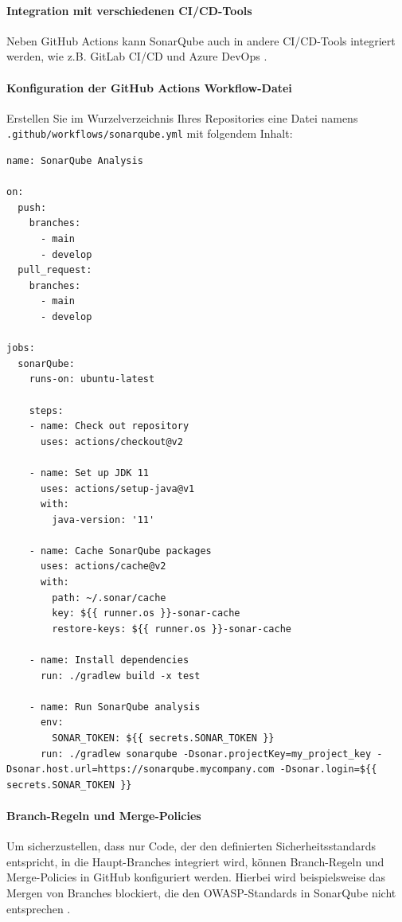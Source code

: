 \paragraph{Integration mit verschiedenen CI/CD-Tools}

Neben GitHub Actions kann SonarQube auch in andere CI/CD-Tools integriert werden, wie z.B. GitLab CI/CD und Azure DevOps \cite{SonarSource2023}.

\paragraph{Konfiguration der GitHub Actions Workflow-Datei}

Erstellen Sie im Wurzelverzeichnis Ihres Repositories eine Datei namens \texttt{.github/workflows/sonarqube.yml} mit folgendem Inhalt:

\begin{lstlisting}
name: SonarQube Analysis

on:
  push:
    branches:
      - main
      - develop
  pull_request:
    branches:
      - main
      - develop

jobs:
  sonarQube:
    runs-on: ubuntu-latest

    steps:
    - name: Check out repository
      uses: actions/checkout@v2

    - name: Set up JDK 11
      uses: actions/setup-java@v1
      with:
        java-version: '11'

    - name: Cache SonarQube packages
      uses: actions/cache@v2
      with:
        path: ~/.sonar/cache
        key: ${{ runner.os }}-sonar-cache
        restore-keys: ${{ runner.os }}-sonar-cache

    - name: Install dependencies
      run: ./gradlew build -x test

    - name: Run SonarQube analysis
      env:
        SONAR_TOKEN: ${{ secrets.SONAR_TOKEN }}
      run: ./gradlew sonarqube -Dsonar.projectKey=my_project_key -Dsonar.host.url=https://sonarqube.mycompany.com -Dsonar.login=${{ secrets.SONAR_TOKEN }}
\end{lstlisting}

\paragraph{Branch-Regeln und Merge-Policies}

Um sicherzustellen, dass nur Code, der den definierten Sicherheitsstandards entspricht, in die Haupt-Branches integriert wird, können Branch-Regeln und Merge-Policies in GitHub konfiguriert werden. Hierbei wird beispielsweise das Mergen von Branches blockiert, die den OWASP-Standards in SonarQube nicht entsprechen \cite{Foundation2023}.

